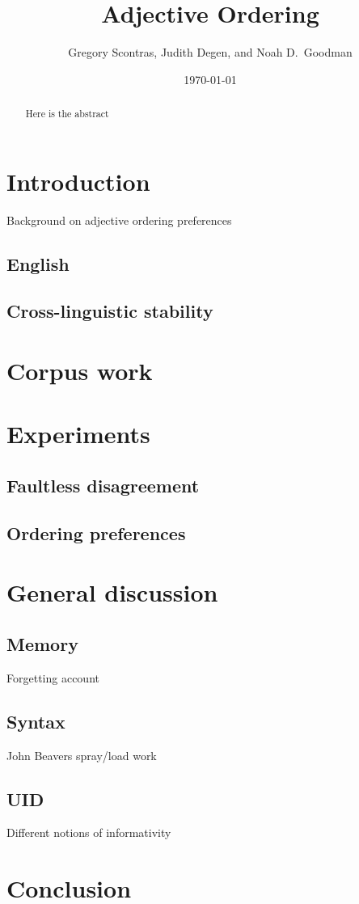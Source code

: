 \documentclass[11pt]{article}
\title{Adjective Ordering}
\author{Gregory Scontras, Judith Degen, and Noah D.~Goodman}
\date{\today}
\begin{document}
\thispagestyle{plain}

\maketitle

\begin{abstract}
	Here is the abstract
\end{abstract}


\section{Introduction}

Background on adjective ordering preferences

\subsection{English}

\subsection{Cross-linguistic stability}


\section{Corpus work}


\section{Experiments}

\subsection{Faultless disagreement}

\subsection{Ordering preferences}


\section{General discussion}



\subsection{Memory}

Forgetting account

\subsection{Syntax}

John Beavers spray/load work

\subsection{UID}

Different notions of informativity


\section{Conclusion}
\end{document}
